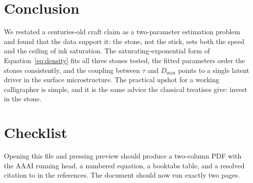 \documentclass[letterpaper]{article} %
\begin{document}
\section{Conclusion}

We restated a centuries-old craft claim as a two-parameter estimation
problem and found that the data support it: the stone, not the stick,
sets both the speed and the ceiling of ink saturation. The
saturating-exponential form of Equation~\ref{eq:density} fits all three
stones tested, the fitted parameters order the stones consistently, and
the coupling between $\tau$ and $D_{\max}$ points to a single latent
driver in the surface microstructure. The practical upshot for a
working calligrapher is simple, and it is the same advice the classical
treatises give: invest in the stone.

\section{Checklist}

Opening this file and pressing preview should produce a two-column PDF
with the AAAI running head, a numbered equation, a booktabs table, and a
resolved citation to \citet{tanaka2019} in the references. The document
should now run exactly two pages.


\end{document}

